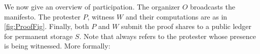 
We now give an overview of \CROCUS participation.\@
    The organizer \(O\) broadcasts the manifesto.
    The protester \(P\), witness \(W\) and their computations are as in \cref{fig:ProofFig}.
    Finally, both \(P\) and \(W\) submit the proof shares to a
   public ledger for permanent storage \(S\). Note that \pid  always refers to the
    protester whose presence is being witnessed. More formally:

